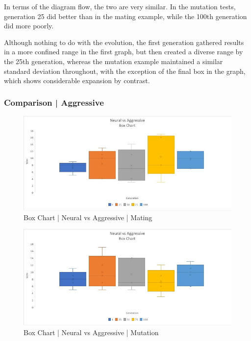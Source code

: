\documentclass[12pt,a4paper]{article}
\begin{document}
In terms of the diagram flow, the two are very similar. In the mutation tests, generation 25 did better than in the mating example, while the 100th generation did more poorly.

Although nothing to do with the evolution, the first generation gathered results in a more confined range in the first graph, but then created a diverse range by the 25th generation, whereas the mutation example maintained a similar standard deviation throughout, with the exception of the final box in the graph, which shows considerable expansion by contrast.  

\subsubsection{Comparison | Aggressive}

\begin{figure}[h]
	\centering
	\includegraphics[width = \textwidth]{BoxAgg2.jpg}
	\caption{Box Chart | Neural vs Aggressive | Mating}
\end{figure}

\begin{figure}[h]
	\centering
	\includegraphics[width = \textwidth]{BoxAgg3.jpg}
	\caption{Box Chart | Neural vs Aggressive | Mutation}
\end{figure}
\end{document}
